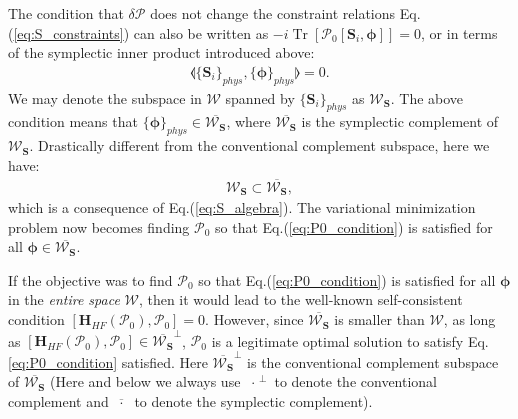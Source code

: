 \begin{subappendices}
    The condition that $\delta \boldsymbol{\mathcal P}$ does not change the constraint relations Eq.(\ref{eq:S_constraints}) can also be written as $-i\mathop{\mathrm{Tr}}[\boldsymbol{\mathcal P}_0[\mathbf S_i,\boldsymbol{\phi}]]=0$, or in terms of the symplectic inner product introduced above:
    \begin{align}
        \llangle\{\mathbf S_i\}_{phys},\{\boldsymbol\phi\}_{phys}\rrangle=0.
    \end{align}
    We may denote the subspace in $\boldsymbol{\mathcal W}$ spanned by $\{\mathbf S_i\}_{phys}$ as $\boldsymbol{\mathcal W}_{\mathbf S}$. The above condition means that $\{\boldsymbol\phi\}_{phys}\in \overline{\boldsymbol{\mathcal W}_{\mathbf S}}$, where $\overline{\boldsymbol{\mathcal W}_{\mathbf S}}$ is the symplectic complement of $\boldsymbol{\mathcal W}_{\mathbf S}$. Drastically different from the conventional complement subspace, here we have:
    \begin{align}
        \boldsymbol{\mathcal W}_{\mathbf S} \subset \overline{\boldsymbol{\mathcal W}_{\mathbf S}},
    \end{align}
    which is a consequence of Eq.(\ref{eq:S_algebra}). The variational minimization problem now becomes finding $\boldsymbol{\mathcal P}_0$ so that Eq.(\ref{eq:P0_condition}) is satisfied for all $\boldsymbol\phi\in\overline{\boldsymbol{\mathcal W}_{\mathbf S}}$.

    If the objective was to find $\boldsymbol{\mathcal P}_0$ so that Eq.(\ref{eq:P0_condition}) is satisfied for all $\boldsymbol\phi$ in the \emph{entire space} $\boldsymbol{\mathcal W}$, then it would lead to the well-known self-consistent condition $[\mathbf H_{HF}(\boldsymbol{\mathcal P}_0),\boldsymbol{\mathcal P}_0]=0$. However, since $\overline{\boldsymbol{\mathcal W}_{\mathbf S}}$ is smaller than $\boldsymbol{\mathcal W}$, as long as $[\mathbf H_{HF}(\boldsymbol{\mathcal P}_0),\boldsymbol{\mathcal P}_0]\in \overline{\boldsymbol{\mathcal W}_{\mathbf S}}^\perp$, $\boldsymbol{\mathcal P}_0$ is a legitimate optimal solution to satisfy Eq.\eqref{eq:P0_condition} satisfied. Here $\overline{\boldsymbol{\mathcal W}_{\mathbf S}}^\perp$ is the conventional complement subspace of $\overline{\boldsymbol{\mathcal W}_{\mathbf S}}$ (Here and below we always use ${\;\cdot\;}^\perp$ to denote the conventional complement and $\overline{\;\cdot\;}$ to denote the symplectic complement).


\end{subappendices}
